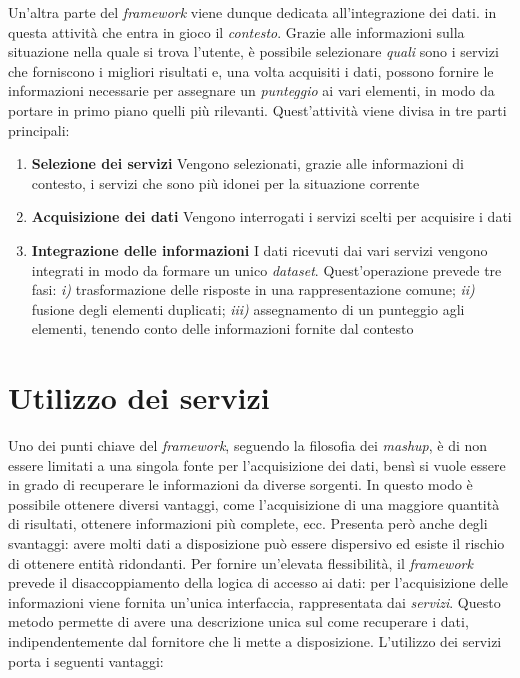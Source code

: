 Un'altra parte del \emph{framework} viene dunque dedicata all'integrazione dei dati. \upe in questa attività che entra in gioco il \emph{contesto}. Grazie alle informazioni sulla situazione nella quale si trova l'utente, è possibile selezionare \emph{quali} sono i servizi che forniscono i migliori risultati e, una volta acquisiti i dati, possono fornire le informazioni necessarie per assegnare un \emph{punteggio} ai vari elementi, in modo da portare in primo piano quelli più rilevanti. Quest'attività viene divisa in tre parti principali:

\begin{enumerate}
	\item \textbf{Selezione dei servizi}
	Vengono selezionati, grazie alle informazioni di contesto, i servizi che sono più idonei per la situazione corrente
	\item \textbf{Acquisizione dei dati}
	Vengono interrogati i servizi scelti per acquisire i dati
	\item \textbf{Integrazione delle informazioni}
	I dati ricevuti dai vari servizi vengono integrati in modo da formare un unico \emph{dataset}. Quest'operazione prevede tre fasi: \emph{i)} trasformazione delle risposte in una rappresentazione comune; \emph{ii)} fusione degli elementi duplicati; \emph{iii)} assegnamento di un punteggio agli elementi, tenendo conto delle informazioni fornite dal contesto
\end{enumerate}

\section{Utilizzo dei servizi\label{sec:utilizzo-servizi}}

Uno dei punti chiave del \emph{framework}, seguendo la filosofia dei \emph{mashup}, è di non essere limitati a una singola fonte per l'acquisizione dei dati, bensì si vuole essere in grado di recuperare le informazioni da diverse sorgenti. In questo modo è possibile ottenere diversi vantaggi, come l'acquisizione di una maggiore quantità di risultati, ottenere informazioni più complete, ecc. Presenta però anche degli svantaggi: avere molti dati a disposizione può essere dispersivo ed esiste il rischio di ottenere entità ridondanti. Per fornire un'elevata flessibilità, il \emph{framework} prevede il disaccoppiamento della logica di accesso ai dati: per l'acquisizione delle informazioni viene fornita un'unica interfaccia, rappresentata dai \emph{servizi}. Questo metodo permette di avere una descrizione unica sul come recuperare i dati, indipendentemente dal fornitore che li mette a disposizione. L'utilizzo dei servizi porta i seguenti vantaggi:

